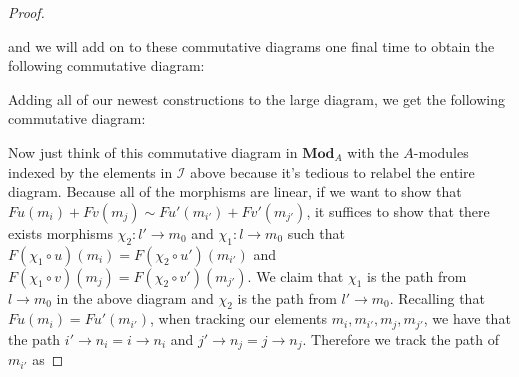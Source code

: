\documentclass{article}
\newcommand{\fI}{\mathscr{I}}
\newcommand{\Mod}{\mathbf{Mod}} %
\begin{document}
\begin{proof}
\begin{center}
    \end{center}
    and we will add on to these commutative diagrams one final time to obtain the following commutative diagram:
    \begin{center}
    \end{center}
    Adding all of our newest constructions to the large diagram, we get the following commutative diagram:
    \begin{center}
    \end{center}
    Now just think of this commutative diagram in $\Mod_A$ with the $A$-modules indexed by the elements in $\fI$ above because it's tedious to relabel the entire diagram. Because all of the morphisms are linear, if we want to show that $Fu(m_i)+Fv(m_j)\sim Fu'(m_{i'})+Fv'(m_{j'})$, it suffices to show that there exists morphisms $\chi_2:l'\to m_0$ and $\chi_1:l\to m_0$ such that $F(\chi_1\circ u)(m_i)= F(\chi_2\circ u')(m_{i'})$ and $F(\chi_1\circ v)(m_j)=F(\chi_2\circ v')(m_{j'})$. We claim that $\chi_1$ is the path from $l\to m_0$ in the above diagram and $\chi_2$ is the path from $l'\to m_0$. Recalling that $Fu(m_i)=Fu'(m_{i'})$, when tracking our elements $m_i,m_{i'},m_j,m_{j'}$, we have that the path $i'\to n_i=i\to n_i$ and $j'\to n_j=j\to n_j$. Therefore we track the path of $m_{i'}$ as

\end{proof}
\end{document}
